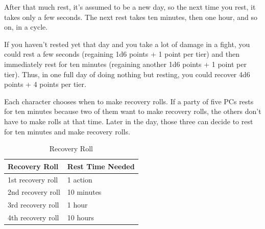 \begin{multicols}{2}
After that much rest, it’s assumed to be a new day, so the next time you rest, it takes only a few seconds. The next rest takes ten minutes, then one hour, and so on, in a cycle.

If you haven’t rested yet that day and you take a lot of damage in a fight, you could rest a few seconds (regaining 1d6 points + 1 point per tier) and then immediately rest for ten minutes (regaining another 1d6 points + 1 point per tier). Thus, in one full day of doing nothing but resting, you could recover 4d6 points + 4 points per tier.

Each character chooses when to make recovery rolls. If a party of five PCs rests for ten minutes because two of them want to make recovery rolls, the others don’t have to make rolls at that time. Later in the day, those three can decide to rest for ten minutes and make recovery rolls.

\end{multicols}

\begin{table}[h]
\centering

\caption{Recovery Roll}
\label{tab:Recovery Roll}
\begin{tabularx}{0.5\textwidth} { | Y | Y | }
\hline
\textbf{Recovery Roll} & \textbf{Rest Time Needed} \\ \hline
1st recovery roll & 1 action   \\ \hline
2nd recovery roll & 10 minutes  \\ \hline
3rd recovery roll & 1 hour  \\ \hline
4th recovery roll & 10 hours  \\ \hline

\end{tabularx}
\end{table}

